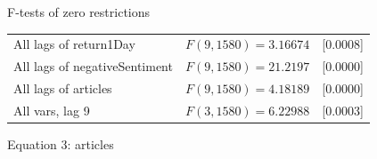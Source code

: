 \begin{center}
F-tests of zero restrictions\\[1em]
\begin{tabular}{lll}
All lags of return1Day & $F(9, 1580) = 3.16674$ & [0.0008]\\
All lags of negativeSentiment & $F(9, 1580) = 21.2197$ & [0.0000]\\
All lags of articles & $F(9, 1580) = 4.18189$ & [0.0000]\\
All vars, lag 9 & $F(3, 1580) = 6.22988$ & [0.0003]\\
\end{tabular}
\end{center}

\begin{center}

Equation 3: articles\\


\end{center}
